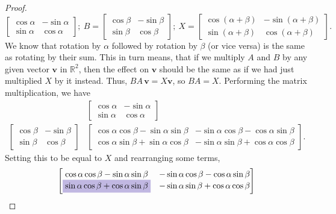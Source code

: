 \documentclass{article}
\begin{document}
\begin{enumerate}
\begin{enumerate}
\begin{proof}
\[\begin{bmatrix}
                    \cos\alpha&-\sin\alpha \\ \sin\alpha&\cos\alpha
                \end{bmatrix};~B = \begin{bmatrix}
                    \cos\beta&-\sin\beta \\ \sin\beta&\cos\beta
                \end{bmatrix};~X =  \begin{bmatrix}
                    \cos(\alpha + \beta)&-\sin(\alpha + \beta) \\ \sin(\alpha+\beta)&\cos(\alpha + \beta)
                \end{bmatrix}.
            \] We know that rotation by \(\alpha\) followed by rotation by \(\beta\) (or vice versa) is the same as rotating by their sum. This in turn means, that if we multiply \(A\) and \(B\) by any given vector \(\mathbf{v}\) in \(\mathbb{R}^2\), then the effect on \(\mathbf{v}\)
            should be the same as if we had just multiplied \(X\) by it instead. Thus, \(BA\,\mathbf{v} = X\mathbf{v}\), so \(BA = X\). Performing the matrix multiplication, we have\begin{align*}
                &\begin{bmatrix}
                    \cos\alpha&-\sin\alpha \\ \sin\alpha&\cos\alpha
                \end{bmatrix} \\
                \begin{bmatrix}
                    \cos\beta&-\sin\beta \\ \sin\beta&\cos\beta
                \end{bmatrix} & \begin{bmatrix}
                    \cos\alpha\cos\beta - \sin\alpha\sin\beta&-\sin\alpha\cos\beta-\cos\alpha\sin\beta \\ 
                    \cos\alpha\sin\beta + \sin\alpha\cos\beta& -\sin\alpha\sin\beta + \cos\alpha\cos\beta
                \end{bmatrix}.
            \end{align*} Setting this to be equal to \(X\) and rearranging some terms,\[
                \begin{bmatrix}
                    \cos\alpha\cos\beta - \sin\alpha\sin\beta&-\sin\alpha\cos\beta-\cos\alpha\sin\beta \\ 
                    \colorbox{Periwinkle!42}{\(\sin\alpha\cos\beta + \cos\alpha\sin\beta\)}& -\sin\alpha\sin\beta + \cos\alpha\cos\beta

\end{bmatrix}\]
\end{proof}
\end{enumerate}
\end{enumerate}
\end{document}
